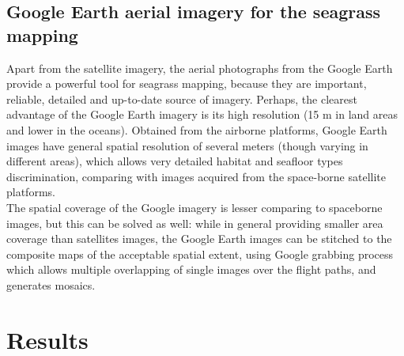 \documentclass[11pt]{article}
\begin{document}
\subsection[Google Earth aerial imagery]{Google Earth aerial imagery for the seagrass mapping}
Apart from the satellite imagery, the aerial photographs from the Google Earth provide
a powerful tool for seagrass mapping, because they are important, reliable, detailed
and up-to-date source of imagery.
Perhaps, the clearest advantage of the Google
Earth imagery is its high resolution (15 m in land areas and lower in the oceans).
Obtained from the airborne platforms, Google Earth images have general spatial
resolution of several meters (though varying in different areas), which allows very
detailed habitat and seafloor types discrimination, comparing with images
acquired from the space-borne satellite platforms.\\
The spatial coverage of the Google imagery is lesser comparing to spaceborne images, but this can be solved as
well: while in general providing smaller area coverage than satellites images, the Google Earth
images can be stitched to the composite maps of the acceptable spatial extent, using Google grabbing
process which allows multiple overlapping of single images over the flight paths, and generates
mosaics.

\section{Results}\label{sec:4}
\end{document}
